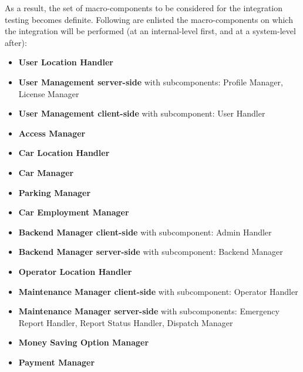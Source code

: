 	As a result, the set of macro-components to be considered for the integration testing becomes definite. Following are enlisted the macro-components on which the integration will be performed (at an internal-level first, and at a system-level after):
	\begin{itemize}
		\item \textbf{User Location Handler}
		\item \textbf{User Management server-side} with subcomponents: Profile Manager, License Manager
		\item \textbf{User Management client-side} with subcomponent: User Handler
		\item \textbf{Access Manager}
		\item \textbf{Car Location Handler}
		\item \textbf{Car Manager}
		\item \textbf{Parking Manager}
		\item \textbf{Car Employment Manager}
		\item \textbf{Backend Manager client-side} with subcomponent: Admin Handler
		\item \textbf{Backend Manager server-side} with subcomponent: Backend Manager
		\item \textbf{Operator Location Handler}
		\item \textbf{Maintenance Manager client-side} with subcomponent: Operator Handler
		\item \textbf{Maintenance Manager server-side} with subcomponents: Emergency Report Handler, Report Status Handler, Dispatch Manager
		\item \textbf{Money Saving Option Manager}
		\item \textbf{Payment Manager}
	\end{itemize}
	

